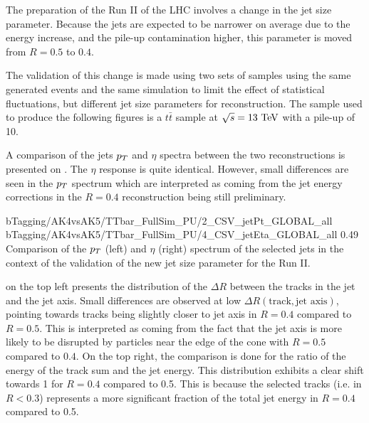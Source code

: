     The preparation of the Run II of the LHC involves a change in the jet size parameter.
    Because the jets are expected to be narrower on average due to the energy increase,
    and the pile-up contamination higher, this parameter is moved from $R = 0.5$ to $0.4$.

    The validation of this change is made using two sets of samples using the same
    generated events and the same simulation to limit the effect of statistical fluctuations,
    but different jet size parameters for reconstruction. The sample
    used to produce the following figures is a $t\bar{t}$ sample at $\sqrt{s} = 13~\text{TeV}$
    with a pile-up of 10.

    A comparison of the jets $p_T$ and $\eta$ spectra between the two reconstructions
    is presented on . The
    $\eta$ response is quite identical. However, small differences are seen in the $p_T$
    spectrum which are interpreted as coming from the jet energy corrections in the
    $R = 0.4$ reconstruction being still preliminary.

                     {bTagging/AK4vsAK5/TTbar_FullSim_PU/2_CSV_jetPt_GLOBAL_all}
                     {bTagging/AK4vsAK5/TTbar_FullSim_PU/4_CSV_jetEta_GLOBAL_all}
                     {0.49}
                     {Comparison of the $p_T$ (left) and $\eta$ (right) spectrum of
                     the selected jets in the context of the validation of the new
                     jet size parameter for the Run II.}

     on the top left
    presents the distribution of the $\Delta R$ between the tracks in the jet
    and the jet axis. Small differences are observed
    at low $\Delta R(\text{track},\text{jet axis})$, pointing towards tracks being slightly
    closer to jet axis in $R = 0.4$ compared to $R = 0.5$. This is interpreted as coming
    from the fact that the jet axis is more likely to be disrupted by particles near
    the edge of the cone with $R = 0.5$ compared to $0.4$.
    On the top right, the comparison is done for the ratio of the energy of the track sum
    and the jet energy. This distribution exhibits a clear shift towards 1 for $R = 0.4$
    compared to 0.5. This is because the selected tracks (i.e. in $R < 0.3$) represents a
    more significant fraction of the total jet energy in $R = 0.4$ compared to 0.5.

